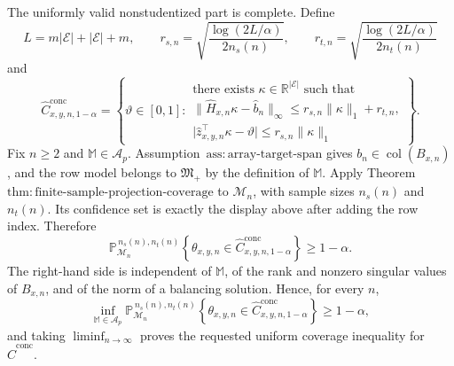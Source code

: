 The uniformly valid nonstudentized part is complete. Define
\[
L=m\lvert\mathcal E\rvert+\lvert\mathcal E\rvert+m,
\qquad
r_{s,n}=\sqrt{\frac{\log(2L/\alpha)}{2n_s(n)}},
\qquad
r_{t,n}=\sqrt{\frac{\log(2L/\alpha)}{2n_t(n)}}
\]
and
\[
\widehat C^{\mathrm{conc}}_{x,y,n,1-\alpha}
=\left\{\vartheta\in[0,1]:
\begin{array}{l}
\text{there exists }\kappa\in\mathbb R^{\lvert\mathcal E\rvert}\text{ such that}\\[2pt]
\lVert\widehat H_{x,n}\kappa-\widehat b_n\rVert_{\infty}
\le r_{s,n}\lVert\kappa\rVert_1+r_{t,n},\\[2pt]
\lvert\widehat z_{x,y,n}^{\top}\kappa-\vartheta\rvert
\le r_{s,n}\lVert\kappa\rVert_1
\end{array}\right\}.
\]
Fix \(n\ge2\) and \(\mathbb M\in\mathcal A_p\). Assumption~\(\mathrm{ass{:}array\text{-}target\text{-}span}\) gives \(b_n\in\operatorname{col}(B_{x,n})\), and the row model belongs to \(\mathfrak M_{+}\) by the definition of \(\mathbb M\). Apply Theorem~\(\mathrm{thm{:}finite\text{-}sample\text{-}projection\text{-}coverage}\) to \(\mathcal M_n\), with sample sizes \(n_s(n)\) and \(n_t(n)\). Its confidence set is exactly the display above after adding the row index. Therefore
\[
\mathbb P_{\mathcal M_n}^{\,n_s(n),n_t(n)}
\left\{\theta_{x,y,n}\in
\widehat C^{\mathrm{conc}}_{x,y,n,1-\alpha}\right\}\ge1-\alpha.
\]
The right-hand side is independent of \(\mathbb M\), of the rank and nonzero singular values of \(B_{x,n}\), and of the norm of a balancing solution. Hence, for every \(n\),
\[
\inf_{\mathbb M\in\mathcal A_p}
\mathbb P_{\mathcal M_n}^{\,n_s(n),n_t(n)}
\left\{\theta_{x,y,n}\in
\widehat C^{\mathrm{conc}}_{x,y,n,1-\alpha}\right\}\ge1-\alpha,
\]
and taking \(\liminf_{n\to\infty}\) proves the requested uniform coverage inequality for \(\widehat C^{\mathrm{conc}}\).

